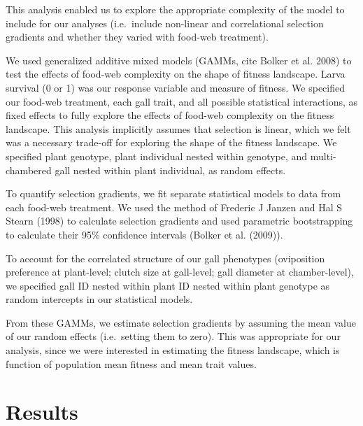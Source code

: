 \documentclass[]{elsarticle} %
\begin{document}
This analysis enabled us to explore the appropriate complexity of the
model to include for our analyses (i.e.~include non-linear and
correlational selection gradients and whether they varied with food-web
treatment).

We used generalized additive mixed models (GAMMs, cite Bolker et al.
2008) to test the effects of food-web complexity on the shape of fitness
landscape. Larva survival (0 or 1) was our response variable and measure
of fitness. We specified our food-web treatment, each gall trait, and
all possible statistical interactions, as fixed effects to fully explore
the effects of food-web complexity on the fitness landscape. This
analysis implicitly assumes that selection is linear, which we felt was
a necessary trade-off for exploring the shape of the fitness landscape.
We specified plant genotype, plant individual nested within genotype,
and multi-chambered gall nested within plant individual, as random
effects.

To quantify selection gradients, we fit separate statistical models to
data from each food-web treatment. We used the method of Frederic J
Janzen and Hal S Stearn (1998) to calculate selection gradients and used
parametric bootstrapping to calculate their 95\% confidence intervals
(Bolker et al. (2009)).

To account for the correlated structure of our gall phenotypes
(oviposition preference at plant-level; clutch size at gall-level; gall
diameter at chamber-level), we specified gall ID nested within plant ID
nested within plant genotype as random intercepts in our statistical
models.

From these GAMMs, we estimate selection gradients by assuming the mean
value of our random effects (i.e.~setting them to zero). This was
appropriate for our analysis, since we were interested in estimating the
fitness landscape, which is function of population mean fitness and mean
trait values.

\section{Results}\label{results}
\end{document}
